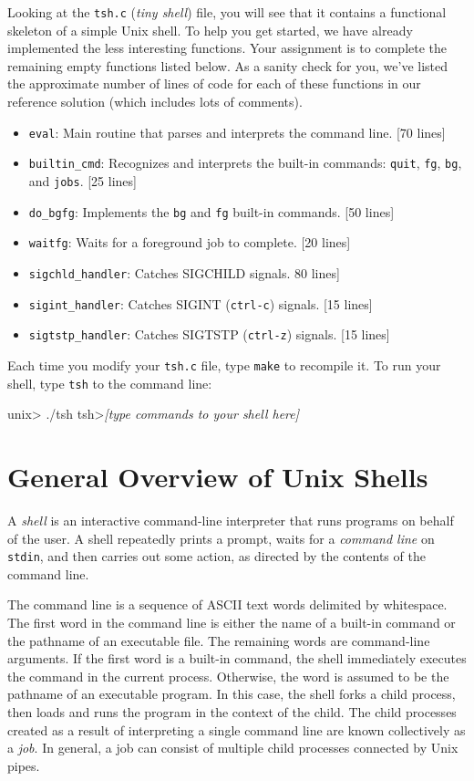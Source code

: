 \documentclass[11pt]{article}
\begin{document}
Looking at the {\tt tsh.c} ({\em tiny shell}) file, you will see that
it contains a functional skeleton of a simple Unix shell. To help you
get started, we have already implemented the less interesting
functions.  Your assignment is to complete the remaining empty
functions listed below.  As a sanity check for you, we've listed the approximate
number of lines of code for each of these functions in our reference
solution (which includes lots of comments).
\begin{itemize}
\item {\tt eval}: Main routine that parses and interprets the command
line. [70 lines]
\item {\tt builtin\_cmd}: Recognizes and interprets the built-in
commands: {\tt quit}, {\tt fg}, {\tt bg}, and {\tt jobs}. [25 lines]
\item {\tt do\_bgfg}: Implements the {\tt bg} and {\tt fg} built-in
commands.  [50 lines]
\item {\tt waitfg}: Waits for a foreground job to complete. [20 lines]
\item {\tt sigchld\_handler}: Catches SIGCHILD signals. 80 lines]
\item {\tt sigint\_handler}: Catches SIGINT ({\tt ctrl-c}) signals. [15 lines] 
\item {\tt sigtstp\_handler}: Catches SIGTSTP ({\tt ctrl-z}) signals. [15 lines]
\end{itemize}

Each time you modify your {\tt tsh.c} file, type {\tt make} to
recompile it. To run your shell, type {\tt tsh} to the 
command line:
\begin{tty}
    unix> ./tsh
    tsh>{\em [type commands to your shell here]}
\end{tty}

\section*{General Overview of Unix Shells}

A {\em shell} is an interactive command-line interpreter that runs
programs on behalf of the user. A shell repeatedly prints a prompt,
waits for a {\em command line} on {\tt stdin}, and then carries out
some action, as directed by the contents of the command line.

The command line is a sequence of ASCII text words delimited by
whitespace.  The first word in the command line is either the name of
a built-in command or the pathname of an executable file. The
remaining words are command-line arguments.  If the first word is a
built-in command, the shell immediately executes the command in the
current process.  Otherwise, the word is assumed to be the pathname of
an executable program. In this case, the shell forks a child process,
then loads and runs the program in the context of the child.  The
child processes created as a result of interpreting a single command
line are known collectively as a {\em job}. In general, a job can
consist of multiple child processes connected by Unix pipes.
\end{document}
